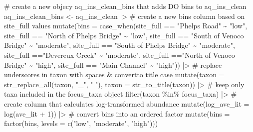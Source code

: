 \documentclass[
  letterpaper,
  DIV=11,
  numbers=noendperiod]{scrartcl}
\newenvironment{Shaded}{\begin{snugshade}}{\end{snugshade}}
\newcommand{\AttributeTok}[1]{\textcolor[rgb]{0.40,0.45,0.13}{#1}}
\newcommand{\CommentTok}[1]{\textcolor[rgb]{0.37,0.37,0.37}{#1}}
\newcommand{\DecValTok}[1]{\textcolor[rgb]{0.68,0.00,0.00}{#1}}
\newcommand{\FunctionTok}[1]{\textcolor[rgb]{0.28,0.35,0.67}{#1}}
\newcommand{\NormalTok}[1]{\textcolor[rgb]{0.00,0.23,0.31}{#1}}
\newcommand{\OtherTok}[1]{\textcolor[rgb]{0.00,0.23,0.31}{#1}}
\newcommand{\SpecialCharTok}[1]{\textcolor[rgb]{0.37,0.37,0.37}{#1}}
\newcommand{\StringTok}[1]{\textcolor[rgb]{0.13,0.47,0.30}{#1}}
\begin{document}
\begin{Shaded}
\begin{Highlighting}[]
\CommentTok{\# create a new objecy aq\_ins\_clean\_bins that adds DO bins to aq\_ins\_clean}
\NormalTok{aq\_ins\_clean\_bins }\OtherTok{\textless{}{-}}\NormalTok{ aq\_ins\_clean }\SpecialCharTok{|\textgreater{}} 
  \CommentTok{\# create a new bins column based on site\_full values}
  \FunctionTok{mutate}\NormalTok{(}\AttributeTok{bins =} \FunctionTok{case\_when}\NormalTok{(site\_full }\SpecialCharTok{==} \StringTok{"Phelps Road"} \SpecialCharTok{\textasciitilde{}} \StringTok{"low"}\NormalTok{,}
\NormalTok{                             site\_full }\SpecialCharTok{==} \StringTok{"North of Phelps Bridge"} \SpecialCharTok{\textasciitilde{}} \StringTok{"low"}\NormalTok{, }
\NormalTok{                             site\_full }\SpecialCharTok{==} \StringTok{"South of Venoco Bridge"} \SpecialCharTok{\textasciitilde{}} \StringTok{"moderate"}\NormalTok{,}
\NormalTok{                             site\_full }\SpecialCharTok{==} \StringTok{"South of Phelps Bridge"} \SpecialCharTok{\textasciitilde{}} \StringTok{"moderate"}\NormalTok{,}
\NormalTok{                             site\_full }\SpecialCharTok{==}\StringTok{"Devereux Creek"} \SpecialCharTok{\textasciitilde{}} \StringTok{"moderate"}\NormalTok{,}
\NormalTok{                             site\_full }\SpecialCharTok{==}\StringTok{"North of Venoco Bridge"} \SpecialCharTok{\textasciitilde{}} \StringTok{"high"}\NormalTok{,}
\NormalTok{                             site\_full }\SpecialCharTok{==} \StringTok{"Main Channel"} \SpecialCharTok{\textasciitilde{}} \StringTok{"high"}\NormalTok{)) }\SpecialCharTok{|\textgreater{}} 
  \CommentTok{\# replace underscores in taxon with spaces \& convertto title case}
  \FunctionTok{mutate}\NormalTok{(}\AttributeTok{taxon =} \FunctionTok{str\_replace\_all}\NormalTok{(taxon, }\StringTok{"\_"}\NormalTok{, }\StringTok{" "}\NormalTok{), }\AttributeTok{taxon =} \FunctionTok{str\_to\_title}\NormalTok{(taxon)) }\SpecialCharTok{|\textgreater{}}
  \CommentTok{\# keep only taxa included in the focus\_taxa object}
  \FunctionTok{filter}\NormalTok{(taxon }\SpecialCharTok{\%in\%}\NormalTok{ focus\_taxa) }\SpecialCharTok{|\textgreater{}}
  \CommentTok{\# create column that calculates log{-}transformed abundance}
  \FunctionTok{mutate}\NormalTok{(}\AttributeTok{log\_ave\_lit =} \FunctionTok{log}\NormalTok{(ave\_lit }\SpecialCharTok{+} \DecValTok{1}\NormalTok{)) }\SpecialCharTok{|\textgreater{}} 
  \CommentTok{\# convert bins into an ordered factor }
  \FunctionTok{mutate}\NormalTok{(}\AttributeTok{bins =} \FunctionTok{factor}\NormalTok{(bins, }\AttributeTok{levels =} \FunctionTok{c}\NormalTok{(}\StringTok{"low"}\NormalTok{, }\StringTok{"moderate"}\NormalTok{, }\StringTok{"high"}\NormalTok{)))}


\end{Highlighting}
\end{Shaded}
\end{document}
